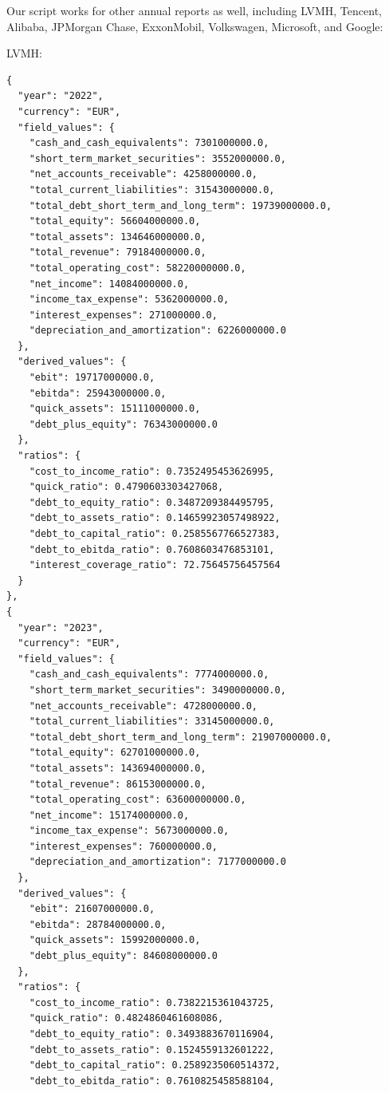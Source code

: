 \documentclass[12pt,a4paper]{article}
\begin{document}
Our script works for other annual reports as well, including LVMH,
Tencent, Alibaba, JPMorgan Chase, ExxonMobil, Volkswagen, Microsoft, and
Google:

LVMH:

\begin{lstlisting}[style=json, caption={Calculated financial ratios for LVMH (FY\,2022--2024)}, label=lst:ratios_lvmh]
{
  "year": "2022",
  "currency": "EUR",
  "field_values": {
    "cash_and_cash_equivalents": 7301000000.0,
    "short_term_market_securities": 3552000000.0,
    "net_accounts_receivable": 4258000000.0,
    "total_current_liabilities": 31543000000.0,
    "total_debt_short_term_and_long_term": 19739000000.0,
    "total_equity": 56604000000.0,
    "total_assets": 134646000000.0,
    "total_revenue": 79184000000.0,
    "total_operating_cost": 58220000000.0,
    "net_income": 14084000000.0,
    "income_tax_expense": 5362000000.0,
    "interest_expenses": 271000000.0,
    "depreciation_and_amortization": 6226000000.0
  },
  "derived_values": {
    "ebit": 19717000000.0,
    "ebitda": 25943000000.0,
    "quick_assets": 15111000000.0,
    "debt_plus_equity": 76343000000.0
  },
  "ratios": {
    "cost_to_income_ratio": 0.7352495453626995,
    "quick_ratio": 0.4790603303427068,
    "debt_to_equity_ratio": 0.3487209384495795,
    "debt_to_assets_ratio": 0.14659923057498922,
    "debt_to_capital_ratio": 0.2585567766527383,
    "debt_to_ebitda_ratio": 0.7608603476853101,
    "interest_coverage_ratio": 72.75645756457564
  }
},
{
  "year": "2023",
  "currency": "EUR",
  "field_values": {
    "cash_and_cash_equivalents": 7774000000.0,
    "short_term_market_securities": 3490000000.0,
    "net_accounts_receivable": 4728000000.0,
    "total_current_liabilities": 33145000000.0,
    "total_debt_short_term_and_long_term": 21907000000.0,
    "total_equity": 62701000000.0,
    "total_assets": 143694000000.0,
    "total_revenue": 86153000000.0,
    "total_operating_cost": 63600000000.0,
    "net_income": 15174000000.0,
    "income_tax_expense": 5673000000.0,
    "interest_expenses": 760000000.0,
    "depreciation_and_amortization": 7177000000.0
  },
  "derived_values": {
    "ebit": 21607000000.0,
    "ebitda": 28784000000.0,
    "quick_assets": 15992000000.0,
    "debt_plus_equity": 84608000000.0
  },
  "ratios": {
    "cost_to_income_ratio": 0.7382215361043725,
    "quick_ratio": 0.4824860461608086,
    "debt_to_equity_ratio": 0.3493883670116904,
    "debt_to_assets_ratio": 0.1524559132601222,
    "debt_to_capital_ratio": 0.2589235060514372,
    "debt_to_ebitda_ratio": 0.7610825458588104,

\end{lstlisting}
\end{document}
